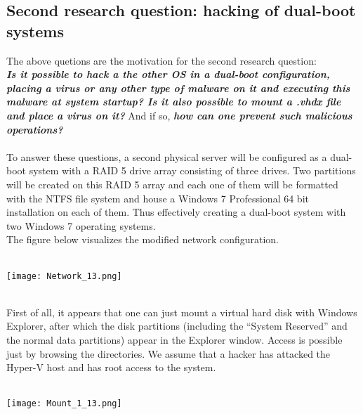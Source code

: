 \subsection{Second research question: hacking of dual-boot systems}

The above quetions are the motivation for the second research question:\\
\emph{\textbf{Is it possible to hack a the other OS in a dual-boot configuration, placing a virus or any other type of malware on it and executing this malware at system startup? Is it also possible to mount a .vhdx file and place a virus on it?}} And if so, \emph{\textbf{how can one prevent such malicious operations?}} \\ \\
To answer these questions, a second physical server will be configured as a dual-boot system with a RAID 5 drive array consisting of three drives. Two partitions will be created on this RAID 5 array and each one of them will be formatted with the NTFS file system and house a Windows 7 Professional 64 bit installation on each of them. Thus effectively creating a dual-boot system with two Windows 7 operating systems. \\
The figure below visualizes the modified network configuration.
$\;$ \\ \\
\noindent\begin{minipage}{\textwidth}
    \centering
    \texttt{[image: Network\_13.png]}
\end{minipage}
$\;$ \\ \\
First of all, it appears that one can just mount a virtual hard disk with Windows Explorer, after which the disk partitions (including the ``System Reserved'' and the normal data partitions) appear in the Explorer window. Access is possible just by browsing the directories. We assume that a hacker has attacked the Hyper-V host and has root access to the system.
$\;$ \\ \\
\noindent\begin{minipage}{\textwidth}
    \centering
    \texttt{[image: Mount\_1\_13.png]}
\end{minipage}
$\;$ \\ \\
